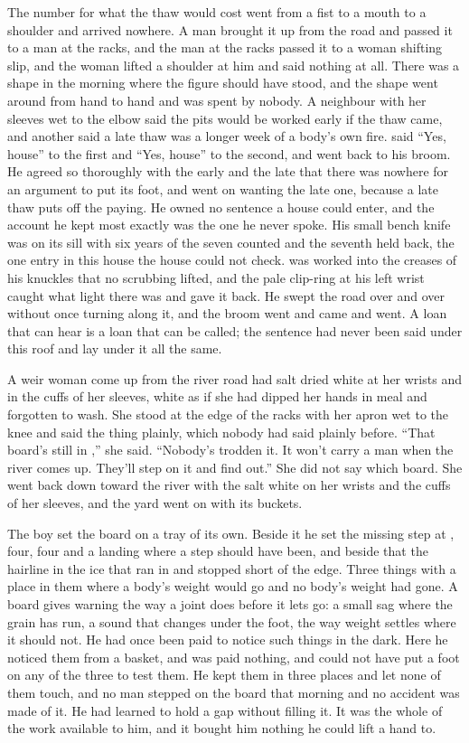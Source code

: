\scenebreak

The number for what the thaw would cost went from a fist to a mouth to a shoulder and arrived nowhere. A man brought it up from the road and passed it to a man at the racks, and the man at the racks passed it to a woman shifting slip, and the woman lifted a shoulder at him and said nothing at all. There was a shape in the morning where the figure should have stood, and the shape went around from hand to hand and was spent by nobody. A neighbour with her sleeves wet to the elbow said the pits would be worked early if the thaw came, and another said a late thaw was a longer week of a body's own fire.  said “Yes, house” to the first and “Yes, house” to the second, and went back to his broom. He agreed so thoroughly with the early and the late that there was nowhere for an argument to put its foot, and went on wanting the late one, because a late thaw puts off the paying. He owned no sentence a house could enter, and the account he kept most exactly was the one he never spoke. His small bench knife was on its sill with six years of the seven counted and the seventh held back, the one entry in this house the house could not check.  was worked into the creases of his knuckles that no scrubbing lifted, and the pale clip-ring at his left wrist caught what light there was and gave it back. He swept the road over and over without once turning along it, and the broom went and came and went. A loan that can hear is a loan that can be called; the sentence had never been said under this roof and lay under it all the same.

A weir woman come up from the river road had salt dried white at her wrists and in the cuffs of her sleeves, white as if she had dipped her hands in meal and forgotten to wash. She stood at the edge of the racks with her apron wet to the knee and said the thing plainly, which nobody had said plainly before. “That board's still in ,” she said. “Nobody's trodden it. It won't carry a man when the river comes up. They'll step on it and find out.” She did not say which board. She went back down toward the river with the salt white on her wrists and the cuffs of her sleeves, and the yard went on with its buckets.

The boy set the board on a tray of its own. Beside it he set the missing step at , four, four and a landing where a step should have been, and beside that the hairline in the ice that ran in and stopped short of the edge. Three things with a place in them where a body's weight would go and no body's weight had gone. A board gives warning the way a joint does before it lets go: a small sag where the grain has run, a sound that changes under the foot, the way weight settles where it should not. He had once been paid to notice such things in the dark. Here he noticed them from a basket, and was paid nothing, and could not have put a foot on any of the three to test them. He kept them in three places and let none of them touch, and no man stepped on the board that morning and no accident was made of it. He had learned to hold a gap without filling it. It was the whole of the work available to him, and it bought him nothing he could lift a hand to.

